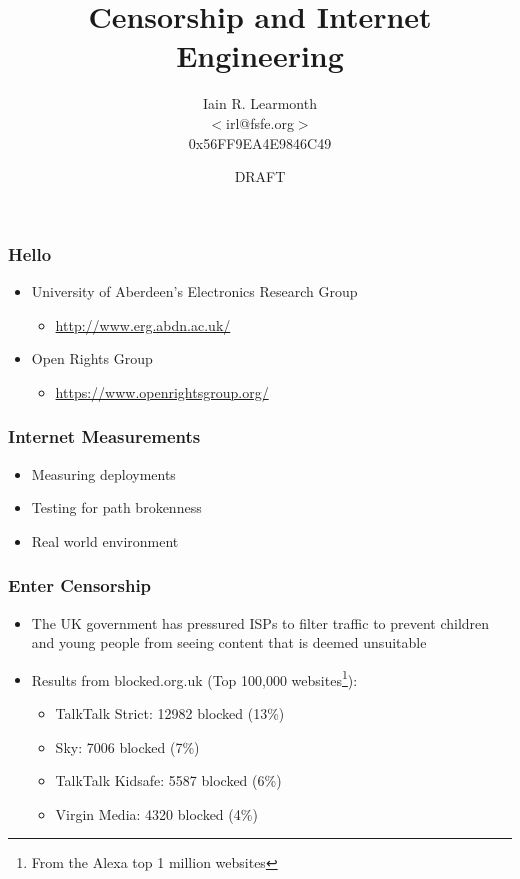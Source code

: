 \documentclass{beamer}
\title{Censorship and Internet Engineering}
\author[Iain R. Learmonth]{Iain R. Learmonth \\ $<$irl@fsfe.org$>$ \\ 0x56FF9EA4E9846C49}
\institute[UoA / ORG]{University of Aberdeen / Open Rights Group}
\date{DRAFT}
\begin{document}
\begin{frame}
\maketitle
\end{frame}

\begin{frame}
	\frametitle{Hello}
	\begin{itemize}
		\item{University of Aberdeen's Electronics Research Group}
			\begin{itemize}
				\item{\url{http://www.erg.abdn.ac.uk/}}
			\end{itemize}
		\item{Open Rights Group}
			\begin{itemize}
				\item{\url{https://www.openrightsgroup.org/}}
			\end{itemize}
	\end{itemize}
\end{frame}

\begin{frame}
	\frametitle{Internet Measurements}
	\begin{itemize}
		\item{Measuring deployments}
		\item{Testing for path brokenness}
		\item{Real world environment}
	\end{itemize}
\end{frame}

\begin{frame}
	\frametitle{Enter Censorship}
	\begin{itemize}
		\item{The UK government has pressured ISPs to filter traffic to prevent children and young people from seeing content that is deemed unsuitable}
		\item{Results from blocked.org.uk (Top 100,000 websites\footnote{From the Alexa top 1 million websites}):}
		\begin{itemize}
			\item{TalkTalk Strict: 12982 blocked (13\%)}
			\item{Sky: 7006 blocked (7\%)}
			\item{TalkTalk Kidsafe: 5587 blocked (6\%)}
			\item{Virgin Media: 4320 blocked (4\%)}
		\end{itemize}
	\end{itemize}
\end{frame}
\end{document}
